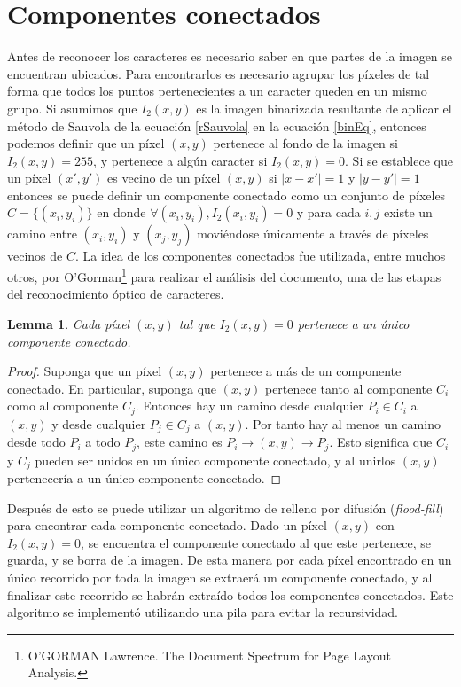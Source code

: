 \documentclass[a4paper, 11pt, oneside]{report}
\begin{document}
\section{Componentes conectados}
\label{sect:conComponents}

Antes de reconocer los caracteres es necesario saber en que partes de la imagen se encuentran ubicados. Para encontrarlos es necesario agrupar los píxeles de tal forma que todos los puntos pertenecientes a un caracter queden en un mismo grupo. Si asumimos que $I_2(x,y)$ es la imagen binarizada resultante de aplicar el método de Sauvola de la ecuación \eqref{rSauvola} en la ecuación \eqref{binEq}, entonces podemos definir que un píxel $(x,y)$ pertenece al fondo de la imagen si $I_2(x,y)=255$, y pertenece a algún caracter si $I_2(x,y)=0$. Si se establece que un píxel $(x',y')$ es vecino de un píxel $(x,y)$ si $|x-x'|=1$ y $|y-y'|=1$ entonces se puede definir un componente conectado como un conjunto de píxeles $C=\{(x_i,y_i)\}$ en donde $\forall{(x_i,y_i)}, I_2(x_i,y_i)=0$ y para cada $i,j$ existe un camino entre $(x_i,y_i)$ y $(x_j,y_j)$ moviéndose únicamente a través de píxeles vecinos de $C$. La idea de los componentes conectados fue utilizada, entre muchos otros, por O'Gorman\footnote{O’GORMAN Lawrence. The Document Spectrum for Page Layout Analysis.} para realizar el análisis del documento, una de las etapas del reconocimiento óptico de caracteres.

\newtheorem{pixHasOneC}{Lemma}
\begin{pixHasOneC}
	Cada píxel $(x,y)$ tal que $I_2(x,y)=0$ pertenece a un único componente conectado.
\end{pixHasOneC}
\begin{proof}
	Suponga que un píxel $(x,y)$ pertenece a más de un componente conectado. En particular, suponga que $(x,y)$ pertenece tanto al componente $C_i$ como al componente $C_j$. Entonces hay un camino desde cualquier $P_i \in C_i$ a $(x,y)$ y desde cualquier $P_j \in C_j$ a $(x,y)$. Por tanto hay al menos un camino desde todo $P_i$ a todo $P_j$, este camino es $P_i \rightarrow (x,y) \rightarrow P_j$. Esto significa que $C_i$ y $C_j$ pueden ser unidos en un único componente conectado, y al unirlos $(x,y)$ pertenecería a un único componente conectado.
\end{proof}

Después de esto se puede utilizar un algoritmo de relleno por difusión ({\em flood-fill}) para encontrar cada componente conectado. Dado un píxel $(x,y)$ con $I_2(x,y)=0$, se encuentra el componente conectado al que este pertenece, se guarda, y se borra de la imagen. De esta manera por cada píxel encontrado en un único recorrido por toda la imagen se extraerá un componente conectado, y al finalizar este recorrido se habrán extraído todos los componentes conectados. Este algoritmo se implementó utilizando una pila para evitar la recursividad.
\end{document}
